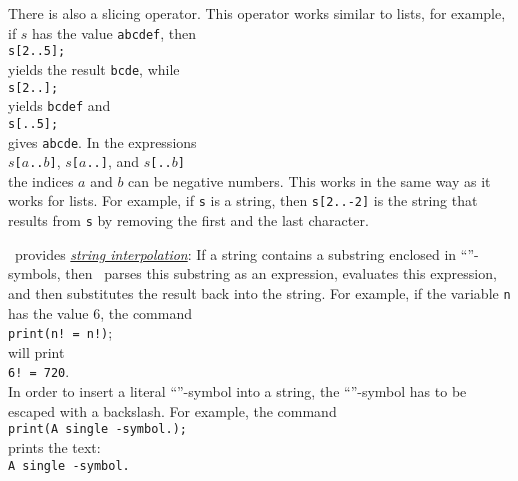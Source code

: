 There is also a slicing operator.  This operator works similar to lists, for example, if $s$ has the value 
\texttt{abcdef}, then 
\\[0.2cm]
\hspace*{1.3cm}
\texttt{s[2..5];}
\\[0.2cm]
yields the result \texttt{bcde}, while 
\\[0.2cm]
\hspace*{1.3cm}
\texttt{s[2..];}
\\[0.2cm]
yields \texttt{bcdef} and 
\\[0.2cm]
\hspace*{1.3cm}
\texttt{s[..5];}
\\[0.2cm]
gives \texttt{abcde}.  In the expressions
\\[0.2cm]
\hspace*{1.3cm}
\texttt{$s$[$a$..$b$]}, \quad \texttt{$s$[$a$..]}, \quad and \quad \texttt{$s$[..$b$]}
\\[0.2cm]
the indices $a$ and $b$ can be negative numbers.  This works in the same way as it works for lists.
For example, if \texttt{s} is a string, then \texttt{s[2..-2]} is the string that results from \texttt{s} by removing the
first and the last character.


\setlx\ provides \href{https://en.wikipedia.org/wiki/String_interpolation}{\emph{string interpolation}}:
If a string contains a substring enclosed in ``\texttt{}''-symbols, then \setlx\ 
parses this substring as an expression, evaluates this expression, and then substitutes the result
back into the string.  For example, if the variable \texttt{n} has the value $6$, the command
\\[0.2cm]
\hspace*{1.3cm}
\texttt{print(n! = n!)};
\\[0.2cm]
will print
\\[0.2cm]
\hspace*{1.3cm}
\texttt{6! = 720}.
\\[0.2cm]
In order to insert a literal ``\texttt{}''-symbol into a string,  the
``\texttt{\symbol{36}}''-symbol has to be escaped with a backslash.  For example, the command
\\[0.2cm]
\hspace*{1.3cm}
\texttt{print(A single -symbol.);}
\\[0.2cm]
prints the text:
\\[0.2cm]
\hspace*{1.3cm}
\texttt{A single -symbol.}

